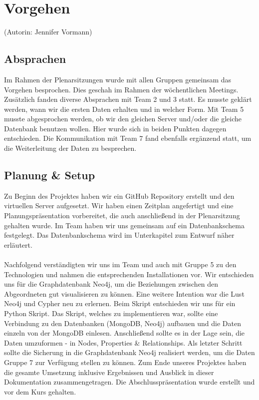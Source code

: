 \section{Vorgehen}\label{sec:04_02_vorgehen}
\noindent
(Autorin: Jennifer Vormann)
\subsection{Absprachen}
Im Rahmen der Plenarsitzungen wurde mit allen Gruppen gemeinsam das Vorgehen besprochen. Dies geschah im Rahmen der wöchentlichen Meetings. Zusätzlich fanden diverse Absprachen mit Team 2 und 3 statt. Es musste geklärt werden, wann wir die ersten Daten erhalten und in welcher Form. Mit Team 5 musste abgesprochen werden, ob wir den gleichen Server und/oder die gleiche Datenbank benutzen wollen. Hier wurde sich in beiden Punkten dagegen entschieden. Die Kommunikation mit Team 7 fand ebenfalls ergänzend statt, um die Weiterleitung der Daten zu besprechen.
\subsection{Planung \& Setup}
Zu Beginn des Projektes haben wir ein GitHub Repository erstellt und den virtuellen Server aufgesetzt. Wir haben einen Zeitplan angefertigt und eine Planungspräsentation vorbereitet, die auch anschließend in der Plenarsitzung gehalten wurde. Im Team haben wir uns gemeinsam auf ein Datenbankschema festgelegt. Das Datenbankschema wird im Unterkapitel zum Entwurf näher erläutert.\\
\\
Nachfolgend verständigten wir uns im Team und auch mit Gruppe 5 zu den Technologien und nahmen die entsprechenden Installationen vor. Wir entschieden uns für die Graphdatenbank Neo4j, um die Beziehungen zwischen den Abgeordneten gut visualisieren zu können. Eine weitere Intention war die Lust Neo4j und Cypher neu zu erlernen. Beim Skript entschieden wir uns für ein Python Skript. Das Skript, welches zu implementieren war, sollte eine Verbindung zu den Datenbanken (MongoDB, Neo4j) aufbauen und die Daten einzeln von der MongoDB einlesen. Anschließend sollte es in der Lage sein, die Daten umzuformen - in Nodes, Properties \& Relationships. Als letzter Schritt sollte die Sicherung in die Graphdatenbank Neo4j realisiert werden, um die Daten Gruppe 7 zur Verfügung stellen zu können. Zum Ende unseres Projektes haben die gesamte Umsetzung inklusive Ergebnissen und Ausblick in dieser Dokumentation zusammengetragen. Die Abschlusspräsentation wurde erstellt und vor dem Kurs gehalten.
